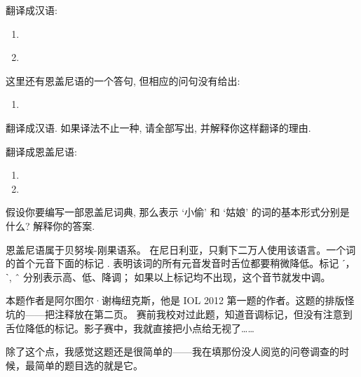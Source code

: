 \begin{assgts}
\item 翻译成汉语:

\begin{enumerate}\setcounter{enumii}{\value{exx}}
\item {} 
\item {}\\
\setcounter{exx}{\value{enumii}}
\end{enumerate}

这里还有恩盖尼语的一个答句, 但相应的问句没有给出:

\begin{enumerate}\setcounter{enumii}{\value{exx}}
\item {}
\setcounter{exx}{\value{enumii}}
\end{enumerate}

翻译成汉语. 如果译法不止一种, 请全部写出, 并解释你这样翻译的理由.

\item 翻译成恩盖尼语:

\begin{enumerate}\setcounter{enumii}{\value{exx}}
\item {}
\item {}
\end{enumerate}

\item 假设你要编写一部恩盖尼词典, 那么表示 ‘小偷’ 和 ‘姑娘’ 的词的基本形式分别是什么? 解释你的答案.
\end{assgts}

恩盖尼语属于贝努埃-刚果语系。 在尼日利亚，只剩下二万人使用该语言。一个词的首个元音下面的标记 . 表明该词的所有元音发音时舌位都要稍微降低。标记 ˊ，ˋ, ˆ 分别表示高、低、降调；
如果以上标记均不出现，这个音节就发中调。

本题作者是阿尔图尔·谢梅纽克斯，他是 IOL 2012 第一题的作者。这题的排版怪坑的——把注释放在第二页。
赛前我校对过此题，知道音调标记，但没有注意到舌位降低的标记。影子赛中，我就直接把小点给无视了……

除了这个点，我感觉这题还是很简单的——我在填那份没人阅览的问卷调查的时候，最简单的题目选的就是它。

